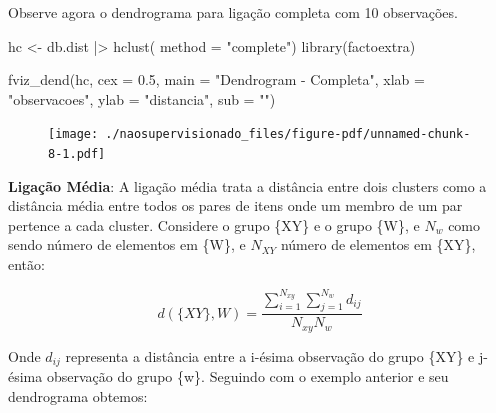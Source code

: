 \documentclass[
  letterpaper,
  DIV=11,
  numbers=noendperiod]{scrreprt}
\newenvironment{Shaded}{\begin{snugshade}}{\end{snugshade}}
\newcommand{\AttributeTok}[1]{\textcolor[rgb]{0.40,0.45,0.13}{#1}}
\newcommand{\FloatTok}[1]{\textcolor[rgb]{0.68,0.00,0.00}{#1}}
\newcommand{\FunctionTok}[1]{\textcolor[rgb]{0.28,0.35,0.67}{#1}}
\newcommand{\NormalTok}[1]{\textcolor[rgb]{0.00,0.23,0.31}{#1}}
\newcommand{\OtherTok}[1]{\textcolor[rgb]{0.00,0.23,0.31}{#1}}
\newcommand{\SpecialCharTok}[1]{\textcolor[rgb]{0.37,0.37,0.37}{#1}}
\newcommand{\StringTok}[1]{\textcolor[rgb]{0.13,0.47,0.30}{#1}}
\begin{document}
Observe agora o dendrograma para ligação completa com 10 observações.

\begin{Shaded}
\begin{Highlighting}[]
\NormalTok{hc }\OtherTok{\textless{}{-}}\NormalTok{  db.dist }\SpecialCharTok{|\textgreater{}} 
  \FunctionTok{hclust}\NormalTok{( }\AttributeTok{method =} \StringTok{"complete"}\NormalTok{) }
\FunctionTok{library}\NormalTok{(factoextra)}

\FunctionTok{fviz\_dend}\NormalTok{(hc, }\AttributeTok{cex =} \FloatTok{0.5}\NormalTok{,}
          \AttributeTok{main =} \StringTok{"Dendrogram {-} Completa"}\NormalTok{,}
          \AttributeTok{xlab =} \StringTok{"observacoes"}\NormalTok{, }\AttributeTok{ylab =} \StringTok{"distancia"}\NormalTok{, }\AttributeTok{sub =} \StringTok{""}\NormalTok{)}
\end{Highlighting}
\end{Shaded}

\begin{figure}[H]

{\centering \texttt{[image: ./naosupervisionado\_files/figure-pdf/unnamed-chunk-8-1.pdf]}

}

\end{figure}

\textbf{Ligação Média}: A ligação média trata a distância entre dois
clusters como a distância média entre todos os pares de itens onde um
membro de um par pertence a cada cluster. Considere o grupo \{XY\} e o
grupo \{W\}, e \(N_w\) como sendo número de elementos em \{W\}, e
\(N_{XY}\) número de elementos em \{XY\}, então:

\[
d(\{XY\},W) = \frac{\sum^{N_{xy}}_{i=1}\sum_{j=1}^{N_w}d_{ij}}{N_{xy}N_w}
\]

Onde \(d_{ij}\) representa a distância entre a i-ésima observação do
grupo \{XY\} e j-ésima observação do grupo \{w\}. Seguindo com o exemplo
anterior e seu dendrograma obtemos:
\end{document}
